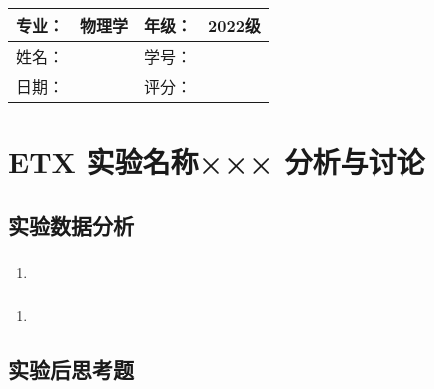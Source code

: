 \documentclass[dvipsnames, svgnames,a4paper,11pt]{article}
\begin{document}
	
	
	\clearpage
	
	\begin{table}
		\renewcommand\arraystretch{1.7}
		\begin{tabularx}{\textwidth}{|X|X|X|X|}
			\hline
			专业：& 物理学 &年级：& 2022级\\
			\hline
			姓名： &  & 学号：& \\
			\hline
			日期：&  & 评分： &\\
			\hline
		\end{tabularx}
	\end{table}
	
	\section{ETX 实验名称××× \quad\heiti 分析与讨论}
	
	\subsection{实验数据分析}
	
	\subsubsection{}
	\begin{enumerate}
		\item 
	\end{enumerate}
	
	\subsubsection{}
	\begin{enumerate}
		\item 
	\end{enumerate}
	
	\subsubsection{}
	
	
	\subsection{实验后思考题}
	
	\begin{question}
		
	\end{question}
	
\end{document}
